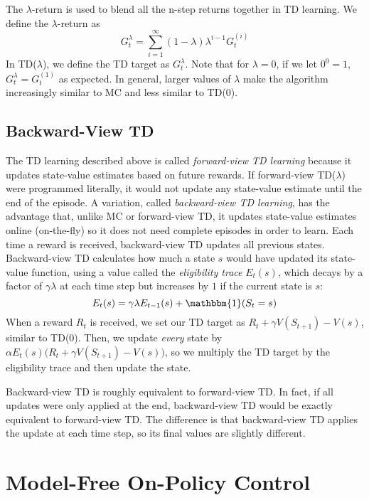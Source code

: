 \documentclass{article}
\newcommand{\ita}{\textit}
\begin{document}
The $\lambda$-return is used to blend all the n-step returns together in TD learning. We define the $\lambda$-return as
\begin{equation}\label{eq:td_lambda_return}
G^\lambda_t = \sum_{i=1}^\infty (1-\lambda)\lambda^{i-1}G^{(i)}_t
\end{equation}
In TD($\lambda$), we define the TD target as $G^\lambda_t$. Note that for $\lambda = 0$, if we let $0^0 = 1$, $G^\lambda_t = G^{(1)}_t$ as expected. In general, larger values of $\lambda$ make the algorithm increasingly similar to MC and less similar to TD(0).

\subsection{Backward-View TD}

The TD learning described above is called \ita{forward-view TD learning} because it updates state-value estimates based on future rewards. If forward-view TD($\lambda$) were programmed literally, it would not update any state-value estimate until the end of the episode. A variation, called \ita{backward-view TD learning}, has the advantage that, unlike MC or forward-view TD, it updates state-value estimates online (on-the-fly) so it does not need complete episodes in order to learn. Each time a reward is received, backward-view TD updates all previous states. Backward-view TD calculates how much a state $s$ would have updated its state-value function, using a value called the \ita{eligibility trace} $E_t(s)$, which decays by a factor of $\gamma\lambda$ at each time step but increases by $1$ if the current state is $s$:
\begin{equation}\label{eq:eligibility_trace_update}
E_t(s) = \gamma\lambda E_{t-1}(s) + \mathbbm{1}(S_t = s)
\end{equation}
When a reward $R_t$ is received, we set our TD target as $R_t + \gamma V(S_{t+1}) - V(s)$, similar to TD(0). Then, we update \ita{every} state by $\alpha E_t(s)\bigg(R_t + \gamma V(S_{t+1}) - V(s)\bigg)$, so we multiply the TD target by the eligibility trace and then update the state.

Backward-view TD is roughly equivalent to forward-view TD. In fact, if all updates were only applied at the end, backward-view TD would be exactly equivalent to forward-view TD. The difference is that backward-view TD applies the update at each time step, so its final values are slightly different.

\section{Model-Free On-Policy Control}
\end{document}
